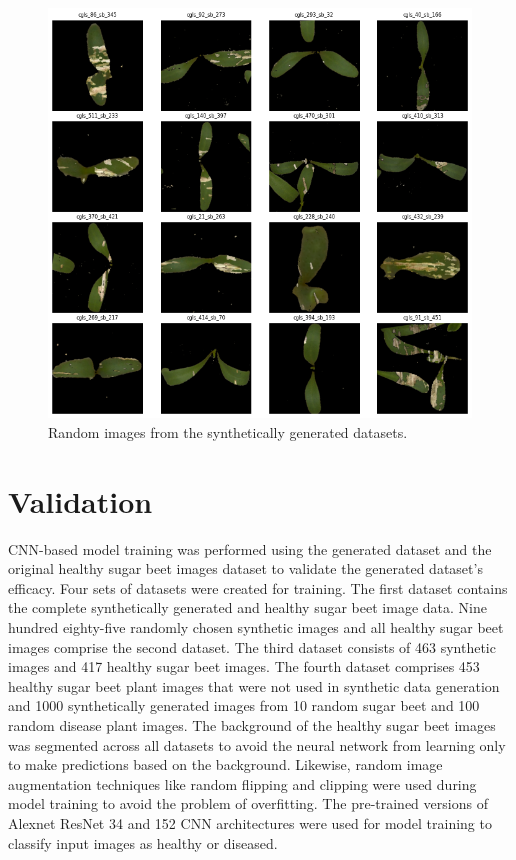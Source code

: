 \begin{figure}[!htb]
    \centering
    \includegraphics[scale=0.68, keepaspectratio]{Figures/notebook/gen-12.png}
    \caption{Random images from the synthetically generated datasets.}
    \label{fig:my_gen_7}
\end{figure} 

\FloatBarrier
\section{Validation}\label{sec:validate}
CNN-based model training was performed using the generated dataset and the original healthy sugar beet images dataset to validate the generated dataset's efficacy. Four sets of datasets were created for training. The first dataset contains the complete synthetically generated and healthy sugar beet image data. Nine hundred eighty-five randomly chosen synthetic images and all healthy sugar beet images comprise the second dataset. The third dataset consists of 463 synthetic images and 417 healthy sugar beet images. The fourth dataset comprises 453 healthy sugar beet plant images that were not used in synthetic data generation and 1000 synthetically generated images from 10 random sugar beet and 100 random disease plant images.
The background of the healthy sugar beet images was segmented across all datasets to avoid the neural network from learning only to make predictions based on the background. Likewise, random image augmentation techniques like random flipping and clipping were used during model training to avoid the problem of overfitting.
The pre-trained versions of Alexnet ResNet 34 and 152 CNN architectures were used for model training to classify input images as healthy or diseased.

